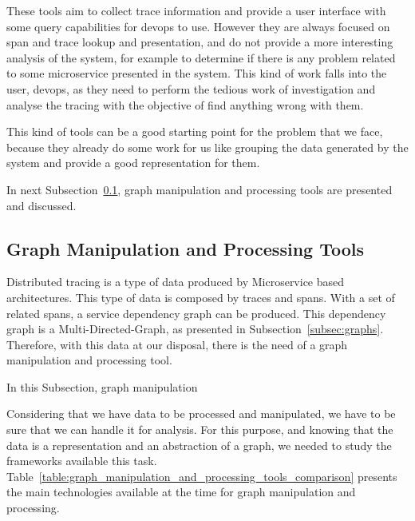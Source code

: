 These tools aim to collect trace information and provide a user interface with some query capabilities for \gls{devops} to use. However they are always focused on span and trace lookup and presentation, and do not provide a more interesting analysis of the system, for example to determine if there is any problem related to some microservice presented in the system. This kind of work falls into the user, \gls{devops}, as they need to perform the tedious work of investigation and analyse the tracing with the objective of find anything wrong with them.

This kind of tools can be a good starting point for the problem that we face, because they already do some work for us like grouping the data generated by the system and provide a good representation for them.

In next Subsection~\ref{subsec:graph_manipulation_and_processing_tools}, graph manipulation and processing tools are presented and discussed.

\subsection{Graph Manipulation and Processing Tools}
\label{subsec:graph_manipulation_and_processing_tools}

Distributed tracing is a type of data produced by Microservice based architectures. This type of data is composed by traces and spans. With a set of related spans, a service dependency graph can be produced. This dependency graph is a Multi-Directed-Graph, as presented in Subsection~\ref{subsec:graphs}. Therefore, with this data at our disposal, there is the need of a graph manipulation and processing tool.

In this Subsection, graph manipulation



Considering that we have data to be processed and manipulated, we have to be sure that we can handle it for analysis. For this purpose, and knowing that the data is a representation and an abstraction of a graph, we needed to study the frameworks available this task. Table~\ref{table:graph_manipulation_and_processing_tools_comparison} presents the main technologies available at the time for graph manipulation and processing.

